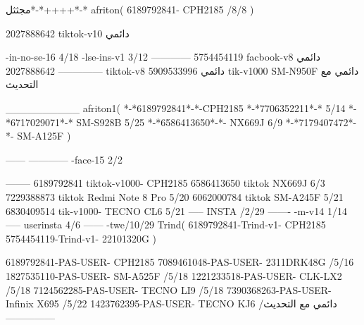 مجثثل*-*++++*-*
afriton(
6189792841- CPH2185  /8/8
)

2027888642 tiktok-v10
دائمي

-in-no-se-16 4/18
-lse-ins-v1 3/12
------------
5754454119 facbook-v8
دائمي
--------------
2027888642 tiktok-v8
دائمي
5909533996 tik-v1000  SM-N950F
دائمي مع التحديث

__________
afriton1(
*-*6189792841*-*-CPH2185
*-*7706352211*-* 5/14
*-*6717029071*-*  SM-S928B 5/25
*-*6586413650*-*- NX669J  6/9
*-*7179407472*-*-  SM-A125F \5
)


------
------------
-face-15 2/2

--------
6189792841 tiktok-v1000- CPH2185 
6586413650 tiktok NX669J  6/3
7229388873 tiktok Redmi Note 8 Pro   5/20
6062000784 tiktok SM-A245F   5/21
6830409514 tik-v1000- TECNO CL6  5/21
-----
 INSTA /2/29
-------
-m-v14 1/14
-----
userinsta 4/6
------
-twe/10/29
Trind(
6189792841-Trind-v1- CPH2185 
5754454119-Trind-v1- 22101320G \5
)

6189792841-PAS-USER- CPH2185 
7089461048-PAS-USER- 2311DRK48G  /5/16
1827535110-PAS-USER- SM-A525F  /5/18
1221233518-PAS-USER-  CLK-LX2  /5/18
7124562285-PAS-USER-  TECNO LI9  /5/18
7390368263-PAS-USER-  Infinix X695  /5/22
1423762395-PAS-USER- TECNO KJ6  /دائمي مع التحديث
    ---------------
